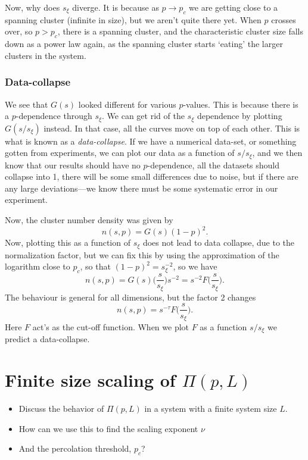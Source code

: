 \documentclass[a4paper, 11pt, notitlepage, english]{article}
\begin{document}
Now, why does $s_\xi$ diverge. It is because as $p\to p_c$ we are getting close to a spanning cluster (infinite in size), but we aren't quite there yet. When $p$ crosses over, so $p > p_c$, there is a spanning cluster, and the characteristic cluster size falls down as a power law again, as the spanning cluster starts `eating' the larger clusters in the system.

\subsubsection*{Data-collapse}

We see that $G(s)$ looked different for various $p$-values. This is because there is a $p$-dependence through $s_\xi$. We can get rid of the $s_\xi$ dependence by plotting $G(s/s_\xi)$ instead. In that case, all the curves move on top of each other. This is what is known as a \emph{data-collapse}. If we have a numerical data-set, or something gotten from experiments, we can plot our data as a function of $s/s_\xi$, and we then know that our results should have no $p$-dependence, all the datasets should collapse into 1, there will be some small differences due to noise, but if there are any large deviations---we know there must be some systematic error in our experiment.

Now, the cluster number density was given by
$$n(s,p) = G(s)(1-p)^2.$$
Now, plotting this as a function of $s_\xi$ does not lead to data collapse, due to the normalization factor, but we can fix this by using the approximation of the logarithm close to $p_c$, so that $(1-p)^2 = s_\xi^{-2}$, so we have
$$n(s,p) = G(s) \bigg(\frac{s}{s_\xi}\bigg) s^{-2} = s^{-2} F\bigg(\frac{s}{s_\xi}\bigg).$$
The behaviour is general for all dimensions, but the factor 2 changes
$$n(s,p) = s^{-\tau} F\bigg(\frac{s}{s_\xi}\bigg).$$
Here $F$ act's as the cut-off function. When we plot $F$ as a function $s/s_\xi$ we predict a data-collapse.

\clearpage


\section{Finite size scaling of $\Pi(p, L)$}
\begin{itemize}
	\item Discuss the behavior of $\Pi(p, L)$ in a system with a finite system size $L$.
	\item How can we use this to find the scaling exponent $\nu$
	\item And the percolation threshold, $p_c$?
\end{itemize}
\end{document}
